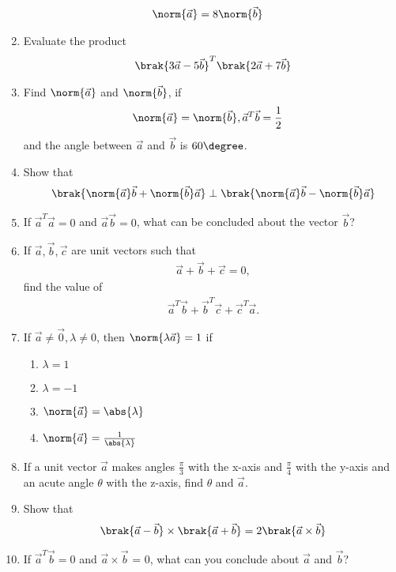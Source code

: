 \begin{enumerate}[label=\arabic*.,ref=\thesubsection.\theenumi]
\begin{align}
\norm{\vec{a}}&=8\norm{\vec{b}}
\end{align}
\item Evaluate the product 
\begin{align}
\brak{3\vec{a}-5\vec{b}}^T\brak{2\vec{a}+7\vec{b}} 
\end{align}
\item Find $\norm{\vec{a}}$ and $\norm{\vec{b}}$, if
\begin{align}
\norm{\vec{a}} &= \norm{\vec{b}},

\vec{a}^T\vec{b} = \frac{1}{2} 
\end{align}
and the angle between $\vec{a}$ and $\vec{b}$ is $60\degree$.
\item Show that 
\begin{align}
\brak{\norm{\vec{a}}\vec{b}+\norm{\vec{b}}\vec{a}}\perp \brak{\norm{\vec{a}}\vec{b}-\norm{\vec{b}}\vec{a}}
\end{align}
\item If $\vec{a}^T\vec{a}=0$ and  $\vec{a}\vec{b}=0$, what can be concluded about the vector $\vec{b}$?
\item If $\vec{a},\vec{b},\vec{c}$ are unit vectors such that 
\begin{align}
\vec{a}+\vec{b}+\vec{c} = 0,
\end{align}
find the value of 
\begin{align}
\vec{a}^T\vec{b}+\vec{b}^T\vec{c}+\vec{c}^T\vec{a}.
\end{align}
\item If $\vec{a} \ne \vec{0}, \lambda \ne 0$, then $\norm{\lambda \vec{a}} = 1$ if
\begin{enumerate}
\item $\lambda =1$
\item $\lambda = -1$
\item $\norm{\vec{a}}=\abs{\lambda}$
\item $\norm{\vec{a}}=\frac{1}{\abs{\lambda}}$
\end{enumerate}
\item If a unit vector $\vec{a}$ makes angles $\frac{\pi}{3}$ with the x-axis and $\frac{\pi}{4}$ with the y-axis and an acute angle $\theta$ with the z-axis, find $\theta$ and $\vec{a}$.
\item Show that 
\begin{align}
\brak{\vec{a}-\vec{b}}\times \brak{\vec{a}+\vec{b}} = 2\brak{\vec{a}\times\vec{b}}
\end{align}
\item If $\vec{a}^T\vec{b} = 0$ and $\vec{a}\times \vec{b}$ = 0, what can you conclude about $\vec{a}$ and $\vec{b}$?

\end{enumerate}
